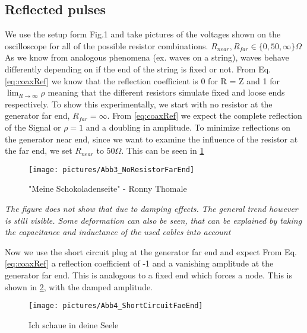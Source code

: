 \documentclass[a4paper,10pt,twocolumn]{article}
\begin{document}
    \subsection{Reflected pulses}\label{subsec:wave-impedance-in-the-coax}
    We use the setup form Fig.1 and take pictures of the voltages shown on the oscilloscope for all of the possible resistor combinations. $R_{near}, R_{far} \in \{ 0,50,\infty\} \Omega$
    As we know from analogous phenomena (ex. waves on a string), waves behave differently depending on if the end of the string is fixed or not.
    From Eq. \ref{eq:coaxRef} we know that the reflection coefficient is 0 for R = Z and 1 for $\lim_{R \to \infty}\rho$ meaning that the different resistors simulate fixed and loose ends respectively.
    To show this experimentally, we start with no resistor at the generator far end, $R_{far} = \infty$.
    From \ref{eq:coaxRef} we expect the complete reflection of the Signal or $\rho = 1$ and a doubling in amplitude.
    To minimize reflections on the generator near end, since we want to examine the influence of the resistor at the far end, we set $R_{near}$ to 50$\Omega$.
    This can be seen in \ref{fig:NoResistorFarEnd}
    \begin{figure}[htbp]                                 %
        \begin{center}                                       %
            \texttt{[image: pictures/Abb3\_NoResistorFarEnd]}      %
            \caption[]{"Meine Schokoladenseite" - Ronny Thomale}   %
            \label{fig:NoResistorFarEnd}                                      %
        \end{center}
    \end{figure}
    \textit{The figure does not show that due to damping effects. The general trend however is still visible. Some deformation can also be seen, that can be explained by taking the capacitance and inductance of the used cables into account}
    
    Now we use the short circuit plug at the generator far end and expect From Eq. \ref{eq:coaxRef} a reflection coefficient of -1 and a vanishing amplitude at the generator far end.
    This is analogous to a fixed end which forces a node.
    This is shown in \ref{fig:ShortCircuitFarEnd}, with the damped amplitude.
    \begin{figure}[htbp]                                 %
        \begin{center}                                       %
            \texttt{[image: pictures/Abb4\_ShortCircuitFaeEnd]}      %
            \caption[]{Ich schaue in deine Seele}   %
            \label{fig:ShortCircuitFarEnd}                                      %
        \end{center}
    \end{figure}
    
\end{document}
